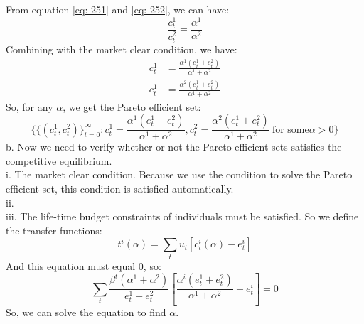 \documentclass{article}
\begin{document}
From equation \eqref{eq: 251} and \eqref{eq: 252}, we can have:
\begin{equation}
	\frac{c^1_t}{c^2_t} = \frac{\alpha^1}{\alpha^2}
\end{equation} 
Combining with the market clear condition, we have:
\begin{align*}
	c^1_t &= \frac{\alpha^1 (e^1_t + e^2_t)}{\alpha^1 + \alpha^2}\\
	c^1_t &= \frac{\alpha^2 (e^1_t + e^2_t)}{\alpha^1 + \alpha^2}
\end{align*}
So, for any $\alpha$, we get the Pareto efficient set:
\begin{equation*}
	\{\{(c^1_t, c^2_t)\}^\infty_{t=0}: c^1_t = \frac{\alpha^1 (e^1_t + e^2_t)}{\alpha^1 + \alpha^2}, c^2_t = \frac{\alpha^2 (e^1_t + e^2_t)}{\alpha^1 + \alpha^2}\ \text{for some} \alpha > 0\}
\end{equation*}
b. Now we need to verify whether or not the Pareto efficient sets satisfies the competitive equilibrium.\\
\indent i. The market clear condition. Because we use the condition to solve the Pareto efficient set, this condition is satisfied automatically.\\
\indent ii. \\
\indent iii. The life-time budget constraints of individuals must be satisfied. So we define the transfer functions:
\begin{equation}
	t^i(\alpha) = \sum\limits_t u_t[c^i_t(\alpha) - e^i_t]
\end{equation}
And this equation must equal 0, so:
\begin{equation}
	\sum\limits_t \frac{\beta^t (\alpha^1 + \alpha^2)}{e^1_t + e^2_t}[\frac{\alpha^i (e^1_t + e^2_t)}{\alpha^1 + \alpha^2} - e^i_t] = 0
\end{equation}
So, we can solve the equation to find $\alpha$.
\end{document}
